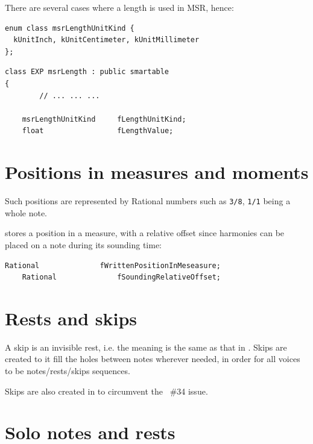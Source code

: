 There are several cases where a length is used in MSR, hence:
\begin{lstlisting}[language=CPlusPlus]
enum class msrLengthUnitKind {
  kUnitInch, kUnitCentimeter, kUnitMillimeter
};
\end{lstlisting}

\begin{lstlisting}[language=CPlusPlus]
class EXP msrLength : public smartable
{
		// ... ... ...

    msrLengthUnitKind     fLengthUnitKind;
    float                 fLengthValue;
\end{lstlisting}


\section{Positions in measures and moments}\label{Positions in measures and moments}

Such positions are represented by Rational numbers such as {\tt 3/8}, {\tt 1/1} being a whole note.

 stores a position in a measure, with a relative offset since harmonies can be placed on a note during its sounding time:
\begin{lstlisting}[language=CPlusPlus]
    Rational              fWrittenPositionInMeseasure;
    Rational              fSoundingRelativeOffset;
\end{lstlisting}


\section{Rests and skips}\label{Rests and skips}

A skip is an invisible rest, i.e. the meaning is the same as that in \lily. Skips are created to {it fill the holes} between notes wherever needed, in order for all voices to be notes/rests/skips sequences.

Skips are also created in \msrToLpsr{} to circumvent the \lily\ \#34 issue.


\section{Solo notes and rests}\label{Solo notes and rests}

